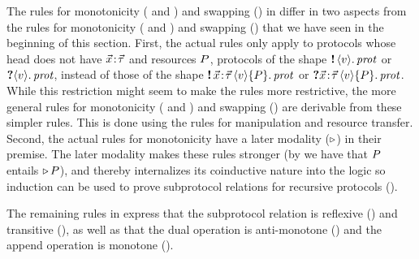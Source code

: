 The rules for monotonicity ( and )
and swapping () in  differ in two aspects
from the rules for monotonicity ( and )
and swapping () that we have seen in the beginning of this
section.
First, the actual rules only apply to protocols whose head does not have
\binders $\vec{x}\!:\!\vec{\tau}$ and resources $P$, \ie protocols of the shape
$\sendprotT {} {\val} {\prot}$ or $\recvprotT {} {\val} {\prot}$, instead of
those of the shape $\sendprot \xdots {\val} {\iprop} {\prot}$ or
$\recvprot \xdots {\val} {\iprop} {\prot}$.
While this restriction might seem to make the rules more restrictive, the more general rules
for monotonicity ( and )
and swapping () are derivable from these simpler rules.
This is done using the rules for \binder manipulation and resource
transfer.
Second, the actual rules for monotonicity have a later modality ($\mathop{{\triangleright}}$) in
their premise.
The later modality makes these rules stronger (by 
we have that $P$ entails $\mathop{{\triangleright}} P$), and thereby internalizes its
coinductive nature into the \lname logic so  induction can be used to
prove subprotocol relations for recursive protocols ().

The remaining rules in 
express that the subprotocol relation is
reflexive () and transitive (),
as well as that the dual operation is anti-monotone () and
the append operation is monotone ().


